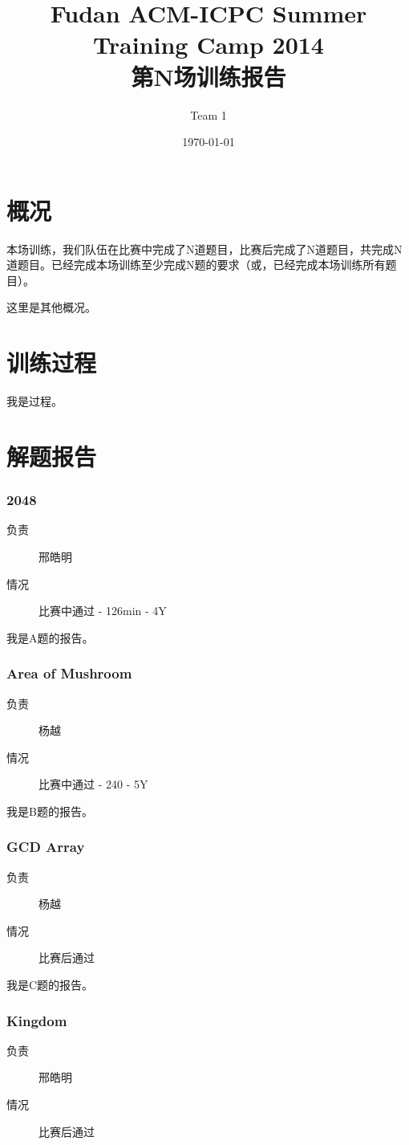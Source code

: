 \documentclass[a4paper, 11pt, nofonts, nocap, fancyhdr]{ctexart}
\title{Fudan ACM-ICPC Summer Training Camp 2014\\第N场训练报告}
\author{Team 1}
\date{\today}
\newcommand{\problem}[1]{\subsubsection{#1}}
\begin{document}
\maketitle

\section{概况}

本场训练，我们队伍在比赛中完成了N道题目，比赛后完成了N道题目，共完成N道题目。已经完成本场训练至少完成N题的要求（或，已经完成本场训练所有题目）。

这里是其他概况。

\section{训练过程}

我是过程。

\section{解题报告}

\problem{2048}

\begin{description}
\item[负责] 邢皓明
\item[情况] 比赛中通过 - 126min - 4Y
\end{description}

我是A题的报告。

\problem{Area of Mushroom}

\begin{description}
\item[负责] 杨越
\item[情况] 比赛中通过 - 240 - 5Y
\end{description}

我是B题的报告。

\problem{GCD Array}

\begin{description}
\item[负责] 杨越
\item[情况] 比赛后通过
\end{description}

我是C题的报告。

\problem{Kingdom}

\begin{description}
\item[负责] 邢皓明
\item[情况] 比赛后通过
\end{description}
\end{document}
